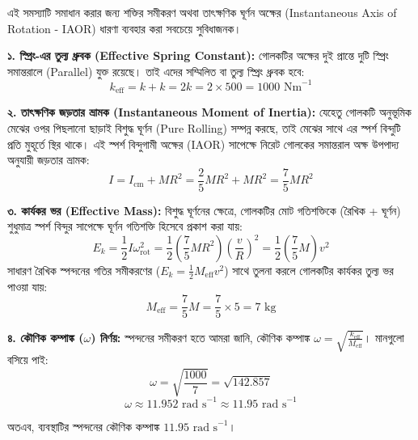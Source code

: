 \documentclass[12pt, a4paper]{article}
\begin{document}
\begin{tcolorbox}[solutionbox={সমাধান (Solution)}]
\noindent
এই সমস্যাটি সমাধান করার জন্য শক্তির সমীকরণ অথবা তাৎক্ষণিক ঘূর্ণন অক্ষের (Instantaneous Axis of Rotation - IAOR) ধারণা ব্যবহার করা সবচেয়ে সুবিধাজনক।

\vspace{0.5em}
\textbf{১. স্প্রিং-এর তুল্য ধ্রুবক (Effective Spring Constant):}
গোলকটির অক্ষের দুই প্রান্তে দুটি স্প্রিং সমান্তরালে (Parallel) যুক্ত রয়েছে। তাই এদের সম্মিলিত বা তুল্য স্প্রিং ধ্রুবক হবে:
$$k_{\text{eff}} = k + k = 2k = 2 \times 500 = 1000\text{ Nm}^{-1}$$

\vspace{0.5em}
\textbf{২. তাৎক্ষণিক জড়তার ভ্রামক (Instantaneous Moment of Inertia):}
যেহেতু গোলকটি অনুভূমিক মেঝের ওপর পিছলানো ছাড়াই বিশুদ্ধ ঘূর্ণন (Pure Rolling) সম্পন্ন করছে, তাই মেঝের সাথে এর স্পর্শ বিন্দুটি প্রতি মুহূর্তে স্থির থাকে। এই স্পর্শ বিন্দুগামী অক্ষের (IAOR) সাপেক্ষে নিরেট গোলকের সমান্তরাল অক্ষ উপপাদ্য অনুযায়ী জড়তার ভ্রামক:
$$I = I_{\text{cm}} + M R^2 = \frac{2}{5} M R^2 + M R^2 = \frac{7}{5} M R^2$$

\vspace{0.5em}
\textbf{৩. কার্যকর ভর (Effective Mass):}
বিশুদ্ধ ঘূর্ণনের ক্ষেত্রে, গোলকটির মোট গতিশক্তিকে (রৈখিক + ঘূর্ণন) শুধুমাত্র স্পর্শ বিন্দুর সাপেক্ষে ঘূর্ণন গতিশক্তি হিসেবে প্রকাশ করা যায়:
$$E_k = \frac{1}{2} I \omega_{\text{rot}}^2 = \frac{1}{2} \left(\frac{7}{5} M R^2\right) \left(\frac{v}{R}\right)^2 = \frac{1}{2} \left(\frac{7}{5} M\right) v^2$$
সাধারণ রৈখিক স্পন্দনের গতির সমীকরণের ($E_k = \frac{1}{2} M_{\text{eff}} v^2$) সাথে তুলনা করলে গোলকটির কার্যকর তুল্য ভর পাওয়া যায়:
$$M_{\text{eff}} = \frac{7}{5} M = \frac{7}{5} \times 5 = 7\text{ kg}$$

\vspace{0.5em}
\textbf{৪. কৌণিক কম্পাঙ্ক ($\omega$) নির্ণয়:}
স্পন্দনের সমীকরণ হতে আমরা জানি, কৌণিক কম্পাঙ্ক $\omega = \sqrt{\frac{k_{\text{eff}}}{M_{\text{eff}}}}$।
মানগুলো বসিয়ে পাই:
$$\omega = \sqrt{\frac{1000}{7}} = \sqrt{142.857}$$
$$\omega \approx 11.952\text{ rad s}^{-1} \approx 11.95\text{ rad s}^{-1}$$

অতএব, ব্যবস্থাটির স্পন্দনের কৌণিক কম্পাঙ্ক $11.95\text{ rad s}^{-1}$।
\end{tcolorbox}
\vspace{1em}
\end{document}
